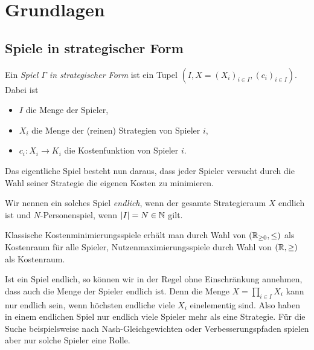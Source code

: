 \section{Grundlagen}\label{sec:Grundlagen}

\subsection{Spiele in strategischer Form}

\begin{defn}
	Ein \emph{Spiel $\Gamma$ in strategischer Form} ist ein Tupel $(I, X = (X_i)_{i \in I}, (c_i)_{i\in I})$. Dabei ist
	\begin{itemize}
		\item $I$ die Menge der Spieler,
		\item $X_i$ die Menge der (reinen) Strategien von Spieler $i$,
		\item $c_i: X_i \to K_i$ die Kostenfunktion von Spieler $i$.
	\end{itemize}
	Das eigentliche Spiel besteht nun daraus, dass jeder Spieler versucht durch die Wahl seiner Strategie die eigenen Kosten zu minimieren.
	
	Wir nennen ein solches Spiel \emph{endlich}, wenn der gesamte Strategieraum $X$ endlich ist und $N$-Personenspiel, wenn $\left|I\right| = N \in \mathbb{N}$ gilt.
\end{defn}

\begin{beob}
	Klassische Kostenminimierungsspiele erhält man durch Wahl von $(\mathbb{R}_{\geq 0}, \leq)$ als Kostenraum für alle Spieler, Nutzenmaximierungsspiele durch Wahl von $(\mathbb{R}, \geq)$ als \glqq Kosten\grqq raum.
\end{beob}

\begin{beob}
	Ist ein Spiel endlich, so können wir in der Regel ohne Einschränkung annehmen, dass auch die Menge der Spieler endlich ist. Denn die Menge $X = \prod_{i\in I} X_i$ kann nur endlich sein, wenn höchsten endliche viele $X_i$ einelementig sind. Also haben in einem endlichen Spiel nur endlich viele Spieler mehr als eine Strategie. Für die Suche beispielsweise nach Nash-Gleichgewichten oder Verbesserungspfaden spielen aber nur solche Spieler eine Rolle. 
\end{beob}

